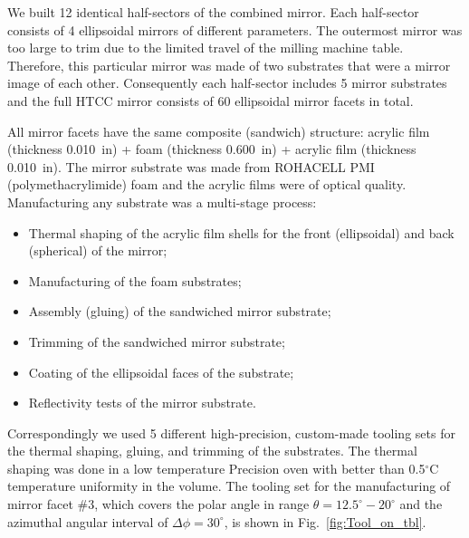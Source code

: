 We built 12 identical half-sectors of the combined mirror. Each half-sector consists of 4 ellipsoidal mirrors of
different parameters. The outermost mirror was too large to trim due to the limited travel of the milling machine
table. Therefore, this particular mirror was made of two substrates that were a mirror image of each other.
Consequently each half-sector includes 5 mirror substrates and the full HTCC mirror consists of 60 ellipsoidal
mirror facets in total. 

All mirror facets have the same composite (sandwich) structure: acrylic film (thickness 0.010~in) + foam
(thickness 0.600~in) + acrylic film (thickness 0.010~in). The mirror substrate was made from ROHACELL PMI
(polymethacrylimide) foam and the acrylic films were of optical quality. Manufacturing any substrate was a
multi-stage process:
\begin{itemize}
    \item Thermal shaping of the acrylic film shells for the front (ellipsoidal) and back (spherical) of the mirror;
    \item Manufacturing of the foam substrates;
    \item Assembly (gluing) of the sandwiched mirror substrate;
    \item Trimming of the sandwiched mirror substrate;
    \item Coating of the ellipsoidal faces of the substrate;
    \item Reflectivity tests of the mirror substrate.
    \end{itemize}

Correspondingly we used 5 different high-precision, custom-made tooling sets for the thermal shaping, gluing,
and trimming of the substrates. The thermal shaping was done in a low temperature Precision oven with better
than 0.5$^\circ$C  temperature uniformity in the volume. The tooling set for the manufacturing of mirror facet
\#3, which covers the polar angle in range $\theta = 12.5^\circ - 20^\circ$ and the azimuthal angular interval of
$\Delta \phi = 30^\circ$, is shown in Fig.~\ref{fig:Tool_on_tbl}.

